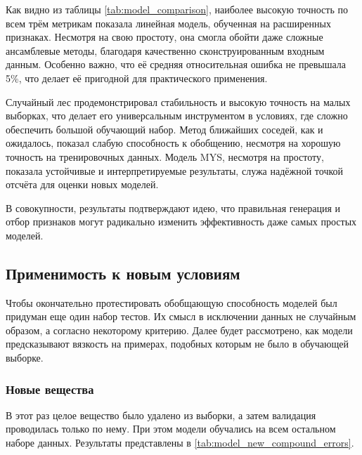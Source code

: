 \documentclass[a4paper,12pt]{article}
\begin{document}
    Как видно из таблицы \autoref{tab:model_comparison}, наиболее высокую точность по всем трём метрикам показала линейная модель, обученная на расширенных признаках. Несмотря на свою простоту, она смогла обойти даже сложные ансамблевые методы, благодаря качественно сконструированным входным данным. Особенно важно, что её средняя относительная ошибка не превышала 5\%, что делает её пригодной для практического применения.
    
    Случайный лес продемонстрировал стабильность и высокую точность на малых выборках, что делает его универсальным инструментом в условиях, где сложно обеспечить большой обучающий набор. Метод ближайших соседей, как и ожидалось, показал слабую способность к обобщению, несмотря на хорошую точность на тренировочных данных. Модель MYS, несмотря на простоту, показала устойчивые и интерпретируемые результаты, служа надёжной точкой отсчёта для оценки новых моделей.
    
    В совокупности, результаты подтверждают идею, что правильная генерация и отбор признаков могут радикально изменить эффективность даже самых простых моделей.

  \subsection{Применимость к новым условиям}

    Чтобы окончательно протестировать обобщающую способность моделей был придуман еще один набор тестов. Их смысл в исключении данных не случайным образом, а согласно некоторому критерию. Далее будет рассмотрено, как модели предсказывают вязкость на примерах, подобных которым не было в обучающей выборке. 

    \subsubsection{Новые вещества}

      В этот раз целое вещество было удалено из выборки, а затем валидация проводилась только по нему. При этом модели обучались на всем остальном наборе данных. Результаты представлены в \autoref{tab:model_new_compound_errors}.
\end{document}
